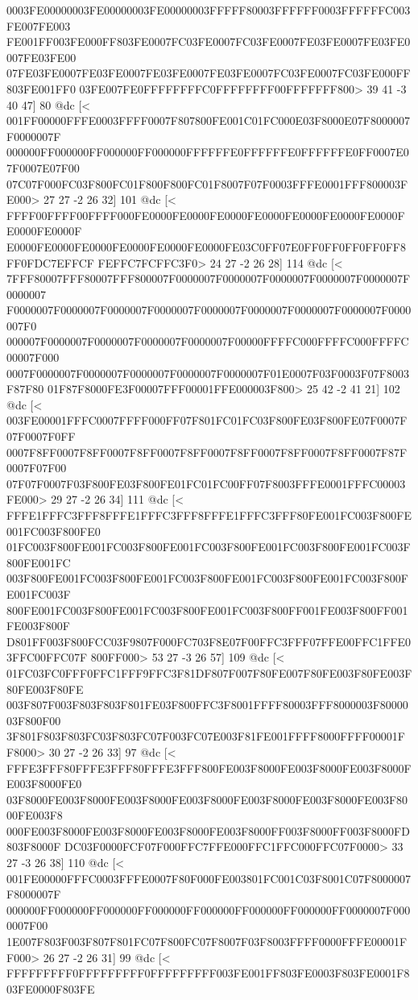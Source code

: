 0003FE00000003FE00000003FE00000003FFFFF80003FFFFFF0003FFFFFFC003FE007FE003
FE001FF003FE000FF803FE0007FC03FE0007FC03FE0007FE03FE0007FE03FE0007FE03FE00
07FE03FE0007FE03FE0007FE03FE0007FE03FE0007FC03FE0007FC03FE000FF803FE001FF0
03FE007FE0FFFFFFFFC0FFFFFFFF00FFFFFFF800>
	 39 41 -3 40 47] 80 @dc
[<
001FF00000FFFE0003FFFF0007F807800FE001C01FC000E03F8000E07F8000007F0000007F
000000FF000000FF000000FF000000FFFFFFE0FFFFFFE0FFFFFFE0FF0007E07F0007E07F00
07C07F000FC03F800FC01F800F800FC01F8007F07F0003FFFE0001FFF800003FE000>
	 27 27 -2 26 32] 101 @dc
[<
FFFF00FFFF00FFFF000FE0000FE0000FE0000FE0000FE0000FE0000FE0000FE0000FE0000F
E0000FE0000FE0000FE0000FE0000FE0000FE03C0FF07E0FF0FF0FF0FF0FF8FF0FDC7EFFCF
FEFFC7FCFFC3F0>
	 24 27 -2 26 28] 114 @dc
[<
7FFF80007FFF80007FFF800007F0000007F0000007F0000007F0000007F0000007F0000007
F0000007F0000007F0000007F0000007F0000007F0000007F0000007F0000007F0000007F0
000007F0000007F0000007F0000007F0000007F00000FFFFC000FFFFC000FFFFC00007F000
0007F0000007F0000007F0000007F0000007F0000007F01E0007F03F0003F07F8003F87F80
01F87F8000FE3F00007FFF00001FFE000003F800>
	 25 42 -2 41 21] 102 @dc
[<
003FE00001FFFC0007FFFF000FF07F801FC01FC03F800FE03F800FE07F0007F07F0007F0FF
0007F8FF0007F8FF0007F8FF0007F8FF0007F8FF0007F8FF0007F8FF0007F87F0007F07F00
07F07F0007F03F800FE03F800FE01FC01FC00FF07F8003FFFE0001FFFC00003FE000>
	 29 27 -2 26 34] 111 @dc
[<
FFFE1FFFC3FFF8FFFE1FFFC3FFF8FFFE1FFFC3FFF80FE001FC003F800FE001FC003F800FE0
01FC003F800FE001FC003F800FE001FC003F800FE001FC003F800FE001FC003F800FE001FC
003F800FE001FC003F800FE001FC003F800FE001FC003F800FE001FC003F800FE001FC003F
800FE001FC003F800FE001FC003F800FE001FC003F800FF001FE003F800FF001FE003F800F
D801FF003F800FCC03F9807F000FC703F8E07F00FFC3FFF07FFE00FFC1FFE03FFC00FFC07F
800FF000>
	 53 27 -3 26 57] 109 @dc
[<
01FC03FC0FFF0FFC1FFF9FFC3F81DF807F007F80FE007F80FE003F80FE003F80FE003F80FE
003F807F003F803F803F801FE03F800FFC3F8001FFFF80003FFF8000003F8000003F800F00
3F801F803F803FC03F803FC07F003FC07E003F81FE001FFFF8000FFFF00001FF8000>
	 30 27 -2 26 33] 97 @dc
[<
FFFE3FFF80FFFE3FFF80FFFE3FFF800FE003F8000FE003F8000FE003F8000FE003F8000FE0
03F8000FE003F8000FE003F8000FE003F8000FE003F8000FE003F8000FE003F8000FE003F8
000FE003F8000FE003F8000FE003F8000FE003F8000FF003F8000FF003F8000FD803F8000F
DC03F0000FCF07F000FFC7FFE000FFC1FFC000FFC07F0000>
	 33 27 -3 26 38] 110 @dc
[<
001FE00000FFFC0003FFFE0007F80F000FE003801FC001C03F8001C07F8000007F8000007F
000000FF000000FF000000FF000000FF000000FF000000FF000000FF0000007F0000007F00
1E007F803F003F807F801FC07F800FC07F8007F03F8003FFFF0000FFFE00001FF000>
	 26 27 -2 26 31] 99 @dc
[<
FFFFFFFFF0FFFFFFFFF0FFFFFFFFF003FE001FF803FE0003F803FE0001F803FE0000F803FE
